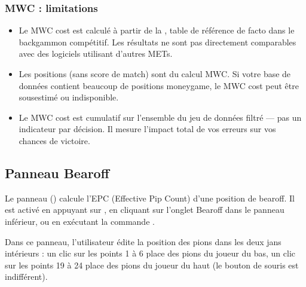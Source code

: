 \documentclass[letterpaper,10pt,french]{sphinxmanual}
\begin{document}
\subsubsection{MWC : limitations}
\label{\detokenize{manuel:mwc-limitations}}\begin{itemize}
\item {} 
\sphinxAtStartPar
Le MWC cost est calculé à partir de la , table de
référence de facto dans le backgammon compétitif. Les résultats ne sont
pas directement comparables avec des logiciels utilisant d’autres METs.

\item {} 
\sphinxAtStartPar
Les positions  (sans score de match) sont  du
calcul MWC. Si votre base de données contient beaucoup de positions
money\sphinxhyphen{}game, le MWC cost peut être sous\sphinxhyphen{}estimé ou indisponible.

\item {} 
\sphinxAtStartPar
Le MWC cost est cumulatif sur l’ensemble du jeu de données filtré — pas
un indicateur par décision. Il mesure l’impact total de vos erreurs sur
vos chances de victoire.

\end{itemize}


\subsection{Panneau Bearoff}
\label{\detokenize{manuel:panneau-bearoff}}\label{\detokenize{manuel:panneau-epc}}
\sphinxAtStartPar
Le panneau  () calcule l’EPC (Effective Pip Count) d’une
position de bearoff. Il est activé en appuyant sur , en cliquant sur
l’onglet Bearoff dans le panneau inférieur, ou en exécutant la commande
.

\sphinxAtStartPar
Dans ce panneau, l’utilisateur édite la position des pions dans les deux
jans intérieurs : un clic sur les points 1 à 6 place des pions du joueur
du bas, un clic sur les points 19 à 24 place des pions du joueur du haut
(le bouton de souris est indifférent).
\end{document}
